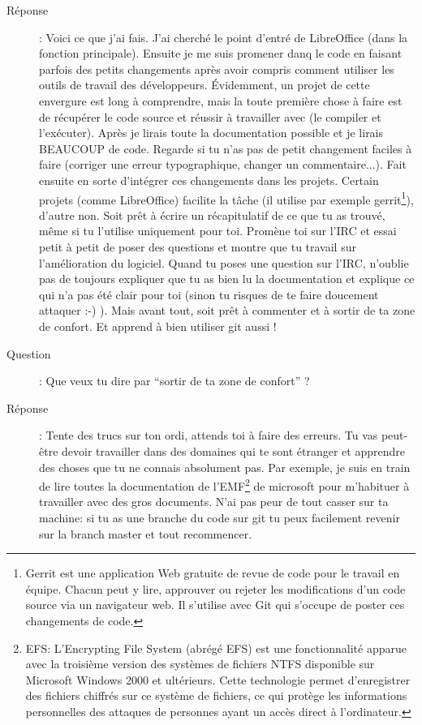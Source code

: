 \documentclass[a4paper,12pt, draft]{report}
\begin{document}
\begin{description}
\item [Réponse]: Voici ce que j'ai fais. J'ai cherché le point d'entré de LibreOffice (dans la fonction principale). Ensuite je me suis promener danq le code en faisant parfois des petits changements après avoir compris comment utiliser les outils de travail des développeurs. Évidemment, un projet de cette envergure est long à comprendre, mais la toute première chose à faire est de récupérer le code source et réussir à travailler avec (le compiler et l'exécuter). Après je lirais toute la documentation possible et je lirais BEAUCOUP de code.  Regarde si tu n'as pas de petit changement faciles à faire (corriger une erreur typographique, changer un commentaire...). Fait ensuite en sorte d'intégrer ces changements dans les projets. Certain projets (comme LibreOffice) facilite la tâche (il utilise par exemple gerrit\footnote{Gerrit est une application Web gratuite de revue de code pour le travail en équipe. Chacun peut y lire, approuver ou rejeter les modifications d'un code source via un navigateur web. Il s'utilise avec Git qui s'occupe de poster ces changements de code.}), d'autre non. Soit prêt à écrire un récapitulatif de ce que tu as trouvé, même si tu l'utilise uniquement pour toi. Promène toi sur l'IRC et essai petit à petit de poser des questions et montre que tu travail sur l'amélioration du logiciel. Quand tu poses une question sur l'IRC, n'oublie pas de toujours expliquer que tu as bien lu la documentation et explique ce qui n'a pas été clair pour toi  (sinon tu risques de te faire doucement attaquer :-) ). Mais avant tout, soit prêt à commenter et à sortir de ta zone de confort. Et apprend à bien utiliser git aussi !
\item [Question]:  Que veux tu dire par ``sortir de ta zone de confort'' ?
\item [Réponse]: Tente des trucs sur ton ordi, attends toi à faire des erreurs. Tu vas peut-être devoir travailler dans des domaines qui te sont étranger et apprendre des choses que tu ne connais absolument pas. Par exemple, je suis en train de lire toutes la documentation de l'EMF\footnote{\textsc{EFS}: L'Encrypting File System (abrégé EFS) est une fonctionnalité apparue avec la troisième version des systèmes de fichiers NTFS disponible sur Microsoft Windows 2000 et ultérieurs. Cette technologie permet d'enregistrer des fichiers chiffrés sur ce système de fichiers, ce qui protège les informations personnelles des attaques de personnes ayant un accès direct à l'ordinateur.} de microsoft pour m'habituer à travailler avec des gros documents.
N'ai pas peur de tout casser sur ta machine: si tu as une branche du code sur git tu peux facilement revenir sur la branch master et tout recommencer.

\end{description}
\end{document}
